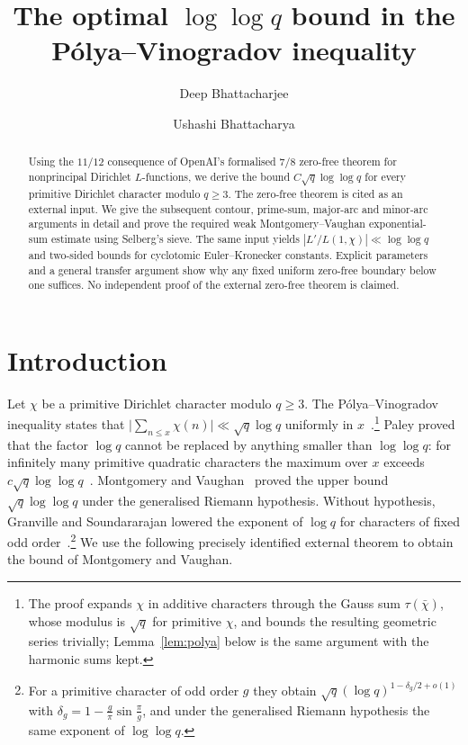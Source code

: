 \documentclass[screen,reqno]{aomart}
\title[The optimal $\log\log q$ bound]{The optimal $\log\log q$ bound in the P\'olya--Vinogradov inequality}
\author[D. Bhattacharjee]{Deep Bhattacharjee}
\author[U. Bhattacharya]{Ushashi Bhattacharya}
\numberwithin{equation}{section}
\theoremstyle{definition}
\begin{document}
\begin{abstract}
Using the $11/12$ consequence of OpenAI's formalised $7/8$ zero-free theorem
for nonprincipal Dirichlet $L$-functions, we derive the bound $C\sqrt q\log\log q$ for every
primitive Dirichlet character modulo $q\ge3$. The zero-free theorem is cited
as an external input. We give the subsequent contour, prime-sum, major-arc
and minor-arc arguments in detail and prove the required weak
Montgomery--Vaughan exponential-sum estimate using Selberg's sieve.
The same input yields $|L'/L(1,\chi)|\ll\log\log q$ and two-sided bounds
for cyclotomic Euler--Kronecker constants. Explicit parameters and a general
transfer argument show why any fixed uniform zero-free boundary below one
suffices. No independent proof of the external zero-free theorem is claimed.
\end{abstract}

\maketitle

\section{Introduction}

Let $\chi$ be a primitive Dirichlet character modulo $q\ge3$. The P\'olya--Vinogradov inequality
states that $\bigl|\sum_{n\le x}\chi(n)\bigr|\ll\sqrt q\log q$ uniformly in
$x$~\cite[Chapter~23]{Dav00}.\footnote{The proof expands $\chi$ in additive characters through the
Gauss sum $\tau(\bar\chi)$, whose modulus is $\sqrt q$ for primitive $\chi$, and bounds the
resulting geometric series trivially; Lemma~\ref{lem:polya} below is the same argument with the
harmonic sums kept.} Paley proved that the factor $\log q$ cannot be replaced by anything smaller
than $\log\log q$: for infinitely many primitive quadratic characters the maximum over $x$ exceeds
$c\sqrt q\log\log q$~\cite{Pal32}. Montgomery and Vaughan~\cite{MV77} proved the upper bound
$\sqrt q\log\log q$ under the generalised Riemann hypothesis. Without hypothesis, Granville and
Soundararajan lowered the exponent of $\log q$ for characters of fixed odd
order~\cite{GS07}.\footnote{For a primitive character of odd order $g$ they obtain
$\sqrt q(\log q)^{1-\delta_g/2+o(1)}$ with $\delta_g=1-\frac g\pi\sin\frac\pi g$, and under the
generalised Riemann hypothesis the same exponent of $\log\log q$.} We use the following precisely identified external theorem to obtain the bound of Montgomery and Vaughan.
\end{document}
